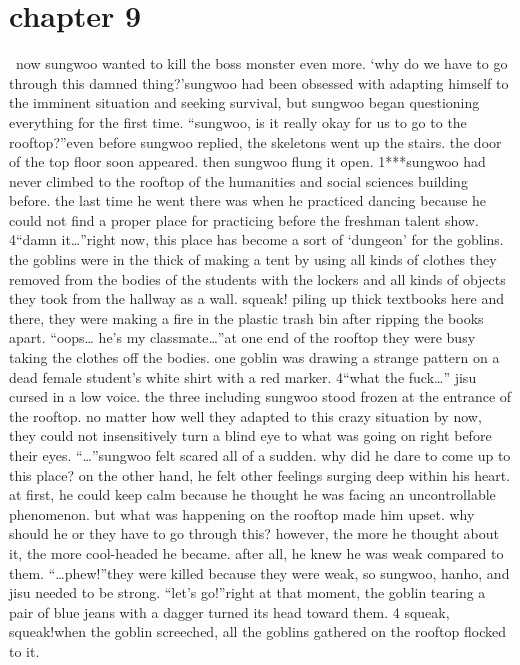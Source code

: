 \section{chapter 9}






 now sungwoo wanted to kill the boss monster even more.
‘why do we have to go through this damned thing?’sungwoo had been obsessed with adapting himself to the imminent situation and seeking survival, but sungwoo began questioning everything for the first time.
“sungwoo, is it really okay for us to go to the rooftop?”even before sungwoo replied, the skeletons went up the stairs.
 the door of the top floor soon appeared.
 then sungwoo flung it open.
1***sungwoo had never climbed to the rooftop of the humanities and social sciences building before.
 the last time he went there was when he practiced dancing because he could not find a proper place for practicing before the freshman talent show.
4“damn it…”right now, this place has become a sort of ‘dungeon’ for the goblins.
 the goblins were in the thick of making a tent by using all kinds of clothes they removed from the bodies of the students with the lockers and all kinds of objects they took from the hallway as a wall.
squeak!
piling up thick textbooks here and there, they were making a fire in the plastic trash bin after ripping the books apart.
“oops… he’s my classmate…”at one end of the rooftop they were busy taking the clothes off the bodies.
 one goblin was drawing a strange pattern on a dead female student’s white shirt with a red marker.
4“what the fuck…” jisu cursed in a low voice.
the three including sungwoo stood frozen at the entrance of the rooftop.
no matter how well they adapted to this crazy situation by now, they could not insensitively turn a blind eye to what was going on right before their eyes.
“…”sungwoo felt scared all of a sudden.
 why did he dare to come up to this place? on the other hand, he felt other feelings surging deep within his heart.
 at first, he could keep calm because he thought he was facing an uncontrollable phenomenon.
 but what was happening on the rooftop made him upset.
 why should he or they have to go through this? however, the more he thought about it, the more cool-headed he became.
 after all, he knew he was weak compared to them.
“…phew!”they were killed because they were weak, so sungwoo, hanho, and jisu needed to be strong.
“let’s go!”right at that moment, the goblin tearing a pair of blue jeans with a dagger turned its head toward them.
4
squeak, squeak!when the goblin screeched, all the goblins gathered on the rooftop flocked to it.
